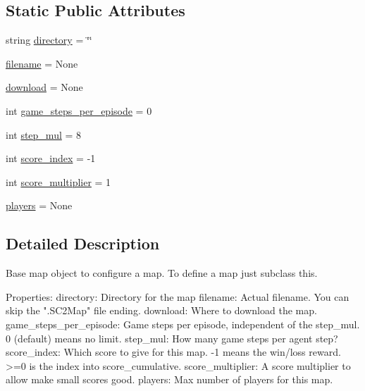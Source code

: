\subsection*{Static Public Attributes}
\begin{DoxyCompactItemize}
\item 
string \mbox{\hyperlink{classpysc2_1_1maps_1_1lib_1_1_map_a4201f79683b533aaa76ee296bca9862a}{directory}} = \char`\"{}\char`\"{}
\item 
\mbox{\hyperlink{classpysc2_1_1maps_1_1lib_1_1_map_abbeaa1936043d4e2ac896a73952bc7cd}{filename}} = None
\item 
\mbox{\hyperlink{classpysc2_1_1maps_1_1lib_1_1_map_af2d3ca026051441ae2607a00f69bcab3}{download}} = None
\item 
int \mbox{\hyperlink{classpysc2_1_1maps_1_1lib_1_1_map_a8ad3432166948ae45fc1641e1b5e7cf2}{game\+\_\+steps\+\_\+per\+\_\+episode}} = 0
\item 
int \mbox{\hyperlink{classpysc2_1_1maps_1_1lib_1_1_map_a7dce4185a3d781a4fd6f6a38a0ff64aa}{step\+\_\+mul}} = 8
\item 
int \mbox{\hyperlink{classpysc2_1_1maps_1_1lib_1_1_map_afa81bf47be6e6d9893f91f5265e4520e}{score\+\_\+index}} = -\/1
\item 
int \mbox{\hyperlink{classpysc2_1_1maps_1_1lib_1_1_map_a46dae41b5720bd53a7846b4a97022951}{score\+\_\+multiplier}} = 1
\item 
\mbox{\hyperlink{classpysc2_1_1maps_1_1lib_1_1_map_ade47838a6cb1202f48b38235c95de6d4}{players}} = None
\end{DoxyCompactItemize}


\subsection{Detailed Description}
\begin{DoxyVerb}Base map object to configure a map. To define a map just subclass this.

Properties:
  directory: Directory for the map
  filename: Actual filename. You can skip the ".SC2Map" file ending.
  download: Where to download the map.
  game_steps_per_episode: Game steps per episode, independent of the step_mul.
      0 (default) means no limit.
  step_mul: How many game steps per agent step?
  score_index: Which score to give for this map. -1 means the win/loss
      reward. >=0 is the index into score_cumulative.
  score_multiplier: A score multiplier to allow make small scores good.
  players: Max number of players for this map.
\end{DoxyVerb}
 

